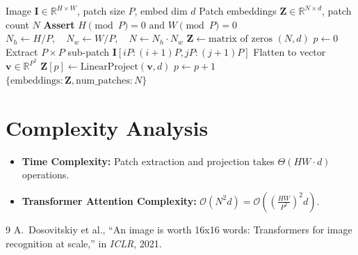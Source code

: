 \documentclass[11pt,a4paper]{article}
\theoremstyle{definition}
\begin{document}
\begin{algorithm}[H]
\caption{ViT Patchify and Linear Projection}
\label{alg:vit_patch}
\begin{algorithmic}[1]
\Require Image $\mathbf{I} \in \mathbb{R}^{H \times W}$, patch size $P$, embed dim $d$
\Ensure Patch embeddings $\mathbf{Z} \in \mathbb{R}^{N \times d}$, patch count $N$
\State \textbf{Assert} $H \pmod P = 0 \text{ and } W \pmod P = 0$
\State $N_h \gets H / P, \quad N_w \gets W / P, \quad N \gets N_h \cdot N_w$
\State $\mathbf{Z} \gets \text{matrix of zeros } (N, d)$
\State $p \gets 0$
        \State Extract $P \times P$ sub-patch $\mathbf{I}[iP : (i+1)P, jP : (j+1)P]$
        \State Flatten to vector $\mathbf{v} \in \mathbb{R}^{P^2}$
        \State $\mathbf{Z}[p] \gets \text{LinearProject}(\mathbf{v}, d)$
        \State $p \gets p + 1$
    \EndFor
\EndFor
\State \Return $\{\text{embeddings}: \mathbf{Z}, \text{num\_patches}: N\}$
\end{algorithmic}
\end{algorithm}

\section{Complexity Analysis}
\begin{itemize}
    \item \textbf{Time Complexity:} Patch extraction and projection takes $\Theta(H W \cdot d)$ operations.
    \item \textbf{Transformer Attention Complexity:} $\mathcal{O}(N^2 d) = \mathcal{O}\left(\left(\frac{HW}{P^2}\right)^2 d\right)$.
\end{itemize}

\begin{thebibliography}{9}
 A.~Dosovitskiy et al., ``An image is worth 16x16 words: Transformers for image recognition at scale,'' in \emph{ICLR}, 2021.
\end{thebibliography}
\end{document}
